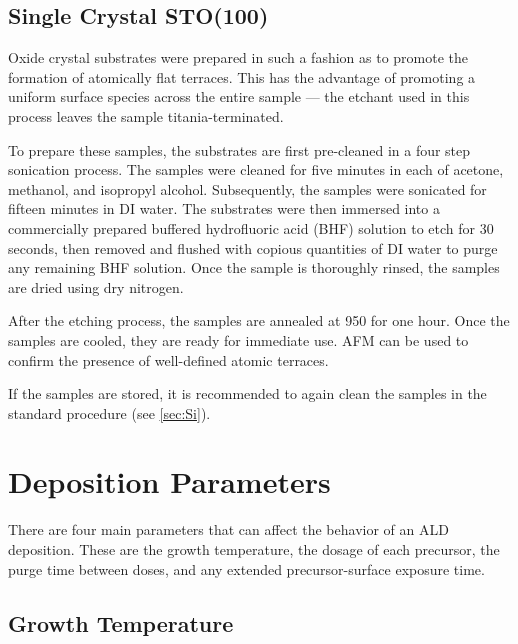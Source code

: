 
\subsection{Single Crystal STO(100)}

Oxide crystal substrates were prepared in such a fashion as to promote the formation of atomically flat terraces. This has the advantage of promoting a uniform surface species across the entire sample --- the etchant used in this process leaves the sample titania-terminated.\cite{koster_quasi-ideal_1998}

To prepare these samples, the substrates are first pre-cleaned in a four step sonication process. The samples were cleaned for five minutes in each of acetone, methanol, and isopropyl alcohol. Subsequently, the samples were sonicated for fifteen minutes in DI water.\cite{koster_quasi-ideal_1998} The substrates were then immersed into a commercially prepared buffered hydrofluoric acid (BHF) solution to etch for 30 seconds, then removed and flushed with copious quantities of DI water to purge any remaining BHF solution.  Once the sample is thoroughly rinsed, the samples are dried using dry nitrogen.\cite{koster_quasi-ideal_1998} 

After the etching process, the samples are annealed at 950\degC{} for one hour.\cite{koster_quasi-ideal_1998} Once the samples are cooled, they are ready for immediate use. AFM can be used to confirm the presence of well-defined atomic terraces. 

If the samples are stored, it is recommended to again clean the samples in the standard procedure (see \vref{sec:Si}).


\section{Deposition Parameters}
\label{sec:SampFab-DepParams}

There are four main parameters that can affect the behavior of an ALD deposition.  These are the growth temperature, the dosage of each precursor, the purge time between doses, and any extended precursor-surface exposure time. 


\subsection{Growth Temperature}

